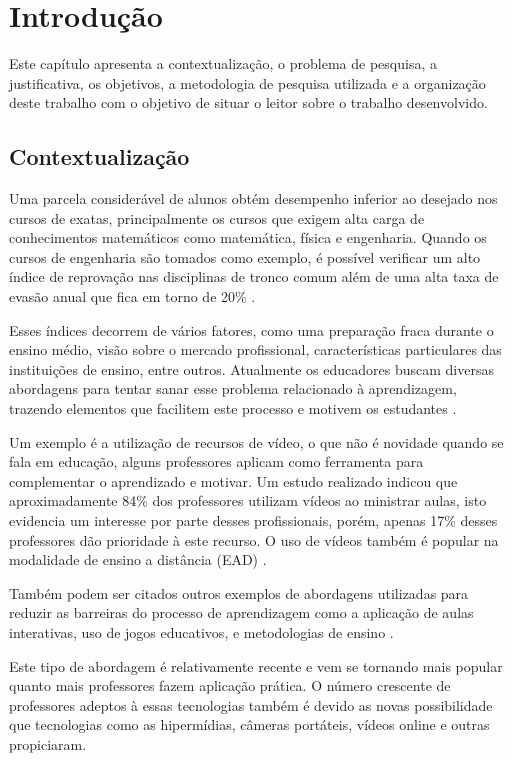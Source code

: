 \chapter[Introdução]{Introdução}

Este capítulo apresenta a contextualização, o problema de pesquisa, a justificativa, os objetivos, a metodologia de pesquisa utilizada e a organização deste trabalho com o objetivo de situar o leitor sobre o trabalho desenvolvido.

\section{Contextualização}

Uma parcela considerável de alunos obtém desempenho inferior ao desejado nos cursos de exatas, principalmente os cursos que exigem alta carga de conhecimentos matemáticos como matemática, física e engenharia. Quando os cursos de engenharia são tomados como exemplo, é possível verificar um alto índice de reprovação nas disciplinas de tronco comum além de uma alta taxa de evasão anual que fica em torno de 20\% \cite{fragelli2012summae}.

Esses índices decorrem de vários fatores, como uma preparação fraca durante o ensino médio, visão sobre o mercado profissional, características particulares das instituições de ensino, entre outros. Atualmente os educadores buscam diversas abordagens para tentar sanar esse problema relacionado à aprendizagem, trazendo elementos que facilitem este processo e motivem os estudantes \cite{fragelliplaycalculo}. 

Um exemplo é a utilização de recursos de vídeo, o que não é novidade quando se fala em educação, alguns professores aplicam como ferramenta para complementar o aprendizado e motivar. Um estudo realizado indicou que aproximadamente 84\% dos professores utilizam vídeos ao ministrar aulas, isto evidencia um interesse por parte desses profissionais, porém, apenas 17\% desses professores dão prioridade à este recurso. O uso de vídeos também é popular na modalidade de ensino a distância (EAD) \cite{vicentini2008uso}. 

Também podem ser citados outros exemplos de abordagens utilizadas para reduzir as barreiras do processo de aprendizagem como a aplicação de aulas interativas, uso de jogos educativos, e metodologias de ensino \cite{fragelli2012osama, fragelli2011batalha, fragelliplaycalculo}.

Este tipo de abordagem é relativamente recente e vem se tornando mais popular quanto mais professores fazem aplicação prática. O número crescente de professores adeptos à essas tecnologias também é devido as novas possibilidade que tecnologias como as hipermídias, câmeras portáteis, vídeos online e outras propiciaram.

